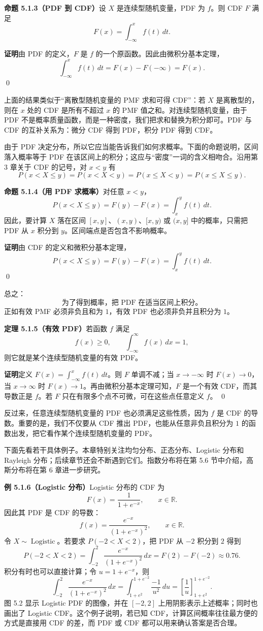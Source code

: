 \documentclass[UTF8,12pt,a4paper,fontset=fandol]{ctexart}
\begin{document}
\noindent\textbf{命题 5.1.3（PDF 到 CDF）}\quad 设 $X$ 是连续型随机变量，PDF 为 $f$。则 CDF $F$ 满足
\[
  F(x)=\int_{-\infty}^x f(t)\,dt.
\]

\noindent\textbf{证明}\quad 由 PDF 的定义，$F$ 是 $f$ 的一个原函数。因此由微积分基本定理，
\[
  \int_{-\infty}^x f(t)\,dt=F(x)-F(-\infty)=F(x).
\]
\qed

上面的结果类似于“离散型随机变量的 PMF 求和可得 CDF”：若 $X$ 是离散型的，则在 $x$ 处的 CDF 是所有不超过 $x$ 的 PMF 值之和。对连续型随机变量，由于 PDF 不是概率质量函数，而是一种密度，我们把求和替换为积分即可。PDF 与 CDF 的互补关系为：微分 CDF 得到 PDF，积分 PDF 得到 CDF。

由于 PDF 决定分布，所以它应当能告诉我们如何求概率。下面的命题说明，区间落入概率等于 PDF 在该区间上的积分；这应与“密度”一词的含义相吻合。沿用第 3 章关于 CDF 的记号，对 $x<y$ 有
\[
  P(x<X\le y)=P(x<X<y)=P(x\le X<y)=P(x\le X\le y).
\]

\noindent\textbf{命题 5.1.4（用 PDF 求概率）}\quad 对任意 $x<y$，
\[
  P(x<X\le y)=F(y)-F(x)=\int_x^y f(t)\,dt.
\]
因此，要计算 $X$ 落在区间 $[x,y]$、$(x,y)$、$[x,y)$ 或 $(x,y]$ 中的概率，只需把 PDF 从 $x$ 积分到 $y$。区间端点是否包含不影响概率。

\noindent\textbf{证明}\quad 由 CDF 的定义和微积分基本定理，
\[
  P(x<X\le y)=F(y)-F(x)=\int_x^y f(t)\,dt.
\]
\qed

总之：
\[
  \text{为了得到概率，把 PDF 在适当区间上积分。}
\]
正如有效 PMF 必须非负且和为 $1$，有效 PDF 也必须非负并且积分为 $1$。

\noindent\textbf{定理 5.1.5（有效 PDF）}\quad 若函数 $f$ 满足
\[
  f(x)\ge 0,\qquad \int_{-\infty}^{\infty} f(x)\,dx=1,
\]
则它就是某个连续型随机变量的有效 PDF。

\noindent\textbf{证明}\quad 定义 $F(x)=\int_{-\infty}^{x} f(t)\,dt$。则 $F$ 单调不减；当 $x\to -\infty$ 时 $F(x)\to0$，当 $x\to\infty$ 时 $F(x)\to1$。再由微积分基本定理可知，$F$ 是一个有效 CDF，而其导数正是 $f$。若 $F$ 只在有限多个点不可微，可在这些点任意定义 $f$。
\qed

反过来，任意连续型随机变量的 PDF 也必须满足这些性质，因为 $f$ 是 CDF 的导数。重要的是，我们不仅要从 CDF 推出 PDF，也能从任意非负且积分为 $1$ 的函数出发，把它看作某个连续型随机变量的 PDF。

下面先看若干具体例子。本章特别关注均匀分布、正态分布、Logistic 分布和 Rayleigh 分布；后续章节还会不断遇到它们。指数分布将在第 5.6 节中介绍，高斯分布将在第 6 章进一步研究。

\noindent\textbf{例 5.1.6（Logistic 分布）}\quad Logistic 分布的 CDF 为
\[
  F(x)=\frac{1}{1+e^{-x}},\qquad x\in\mathbb{R}.
\]
因此其 PDF 是 CDF 的导数：
\[
  f(x)=\frac{e^{-x}}{(1+e^{-x})^2},\qquad x\in\mathbb{R}.
\]
令 $X\sim\operatorname{Logistic}$。若要求 $P(-2<X<2)$，把 PDF 从 $-2$ 积分到 $2$ 得到
\[
  P(-2<X<2)=\int_{-2}^{2}\frac{e^{-x}}{(1+e^{-x})^2}\,dx
  =F(2)-F(-2)\approx 0.76.
\]
积分有时也可以直接计算；令 $u=1+e^{-x}$，则
\[
  \int_{-2}^{2}\frac{e^{-x}}{(1+e^{-x})^2}\,dx
  =\int_{1+e^2}^{1+e^{-2}}\frac{-1}{u^2}\,du
  =\left[\frac{1}{u}\right]_{1+e^2}^{1+e^{-2}}.
\]
图 5.2 显示 Logistic PDF 的图像，并在 $[-2,2]$ 上用阴影表示上述概率；同时也画出了 Logistic CDF。这个例子说明，若已知 CDF，计算区间概率往往最方便的方式是直接用 CDF 的差，而 PDF 或 CDF 都可以用来确认答案是否合理。
\end{document}
